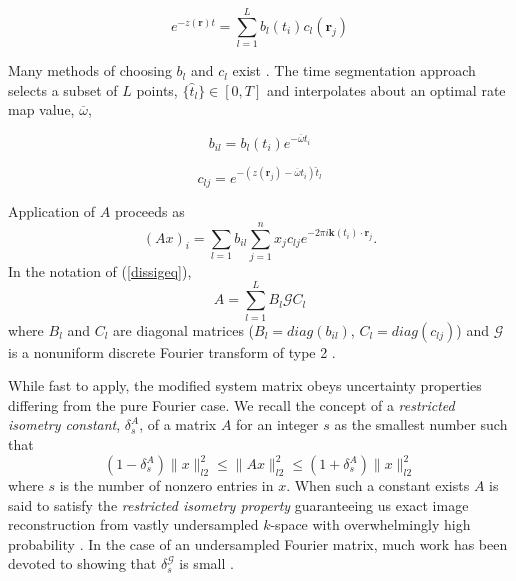 \documentclass[12pt]{amsart}
\theoremstyle{remark}
\begin{document}
\begin{equation}
e^{-z(\mathbf{r})t} = \sum_{l=1}^L b_{l}(t_i)c_{l}(\mathbf{r}_j)
\end{equation}

Many methods of choosing $b_l$ and $c_l$ exist \cite{Man} \cite{Fessler2005}. The time segmentation approach \cite{Sutton2003} selects a subset of $L$ points, $\{ \hat{t}_l \} \in [0,T]$ and interpolates about an optimal rate map value, $\overline{\omega}$,

\begin{equation}
b_{il} = b_l(t_i)e^{-\overline{\omega}t_i}
\end{equation}

\begin{equation}
c_{lj} = e^{-(z(\mathbf{r}_j) - \overline{\omega}t_i)\hat{t}_l}
\end{equation}

Application of $A$ proceeds as
\begin{equation}
(Ax)_i = \sum_{l=1} b_{il} \sum_{j=1}^n x_j c_{lj} e^{-2\pi i \mathbf{k}(t_i) \cdot \mathbf{r}_j}.
\end{equation}
In the notation of (\ref{dissigeq}),
\begin{equation}\label{aprox}
A = \sum_{l=1}^L B_l \mathcal{G} C_l 
\end{equation}
where $B_l$ and $C_l$ are diagonal matrices ($B_l = diag (b_{il})$, $C_l = diag (c_{lj})$) and $\mathcal{G}$ is a nonuniform discrete Fourier transform of type 2 \cite{Greengard2004}.

While fast to apply, the modified system matrix obeys uncertainty properties differing from the pure Fourier case.
We recall the concept of a {\it restricted isometry constant}, $\delta_s^A$, of a matrix $A$ for an integer $s$ as the smallest number such that
\begin{equation}
(1-\delta_s^A)\|x\|_{l2}^2 \leq \|Ax\|_{l2}^2 \leq (1+\delta_s^A)\|x\|_{l2}^2
\end{equation}
where $s$ is the number of nonzero entries in $x$. When such a constant exists $A$ is said to satisfy the {\it restricted isometry property} guaranteeing us exact image reconstruction from vastly undersampled $k$-space with overwhelmingly high probability \cite{Donoho2004}. In the case of an undersampled Fourier matrix, much work has been devoted to showing that $\delta_s^{\mathcal{G}}$ is small \cite{Candes2006} \cite{Candes.2006}.
\end{document}
